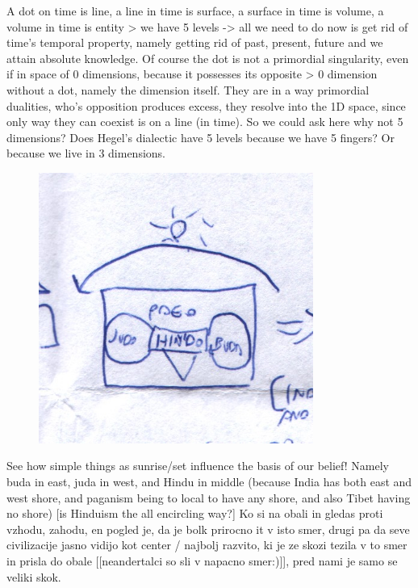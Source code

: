 \documentclass{book}
\begin{document}
A dot on time is line, a line in time is surface, a surface in time is volume, a volume in time is entity > we have 5 levels -> all we need to do now is get rid of time's temporal property, namely getting rid of past, present, future and we attain absolute knowledge.
Of course the dot is not a primordial singularity, even if in space of 0 dimensions, because it possesses its opposite > 0 dimension without a dot, namely the dimension itself. They are in a way primordial dualities, who's opposition produces excess, they resolve into the 1D space, since only way they can coexist is on a line (in time).
So we could ask here why not 5 dimensions? Does Hegel's dialectic have 5 levels because we have 5 fingers? Or because we live in 3 dimensions.
\begin{figure}[ht!]
\centering
\includegraphics[width=90mm]{scan01.jpg}
\label{overflow}
\end{figure}
See how simple things as sunrise/set influence the basis of our belief! Namely buda in east, juda in west, and Hindu in middle (because India has both east and west shore, and paganism being to local to have any shore, and also Tibet having no shore) [is Hinduism the all encircling way?] Ko si na obali in gledas proti vzhodu, zahodu, en pogled je, da je bolk prirocno it v isto smer, drugi pa da seve civilizacije jasno vidijo kot center / najbolj razvito, ki je ze skozi tezila v to smer in prisla do obale [[neandertalci so sli v napacno smer:)]], pred nami je samo se veliki skok.
\end{document}
